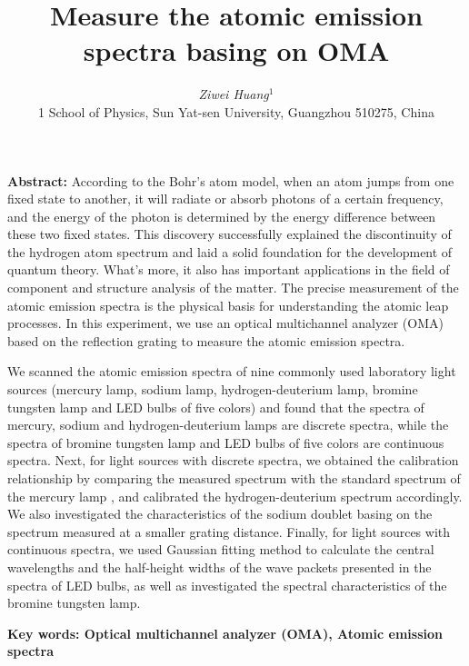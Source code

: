 \documentclass[12pt,a4paper,UTF8]{ctexart}
\begin{document}
\title{\Large\bfseries Measure the atomic emission spectra basing on OMA\footnotemark[1]}
\author{\large\textit{Ziwei Huang}$^{1}$\footnotemark[2] \\ 
\small{1 School of Physics, Sun Yat-sen University, Guangzhou  { \rm 510275}, China}}
\date{}
\maketitle\thispagestyle{empty} 

\begin{spacing}{1.7}
{\bfseries Abstract:}
According to the Bohr's atom model, when an atom jumps from one fixed state to another, it will radiate or absorb photons of a certain frequency, and the energy of the photon is determined by the energy difference between these two fixed states. This discovery successfully explained the discontinuity of the hydrogen atom spectrum and laid a solid foundation for the development of quantum theory. What's more, it also has important applications in the field of component and structure analysis of the matter. The precise measurement of the atomic emission spectra is the physical basis for understanding the atomic leap processes. In this experiment, we use an optical multichannel analyzer (OMA)  based on the reflection grating to measure the atomic emission spectra.

We scanned the atomic emission spectra of nine commonly used laboratory light sources (mercury lamp, sodium lamp, hydrogen-deuterium lamp, bromine tungsten lamp and LED bulbs of five colors) and found that the spectra of mercury, sodium and hydrogen-deuterium lamps are discrete spectra, while the spectra of bromine tungsten lamp and LED bulbs of five colors are continuous spectra. Next, for light sources with discrete spectra, we obtained the calibration relationship by comparing the measured spectrum with the standard spectrum of the mercury lamp , and calibrated the hydrogen-deuterium spectrum accordingly. We also investigated the characteristics of the sodium doublet basing on the spectrum measured at a smaller grating distance. Finally, for light sources with continuous spectra, we used Gaussian fitting method to calculate the central wavelengths and the half-height widths of the wave packets presented in the spectra of LED bulbs, as well as investigated the spectral characteristics of the bromine tungsten lamp.
\par
\bfseries{Key words}: Optical multichannel analyzer (OMA), Atomic emission spectra
\vspace{2em}
\end{spacing}

\renewcommand{\thefootnote}{\fnsymbol{footnote}}
\end{document}
